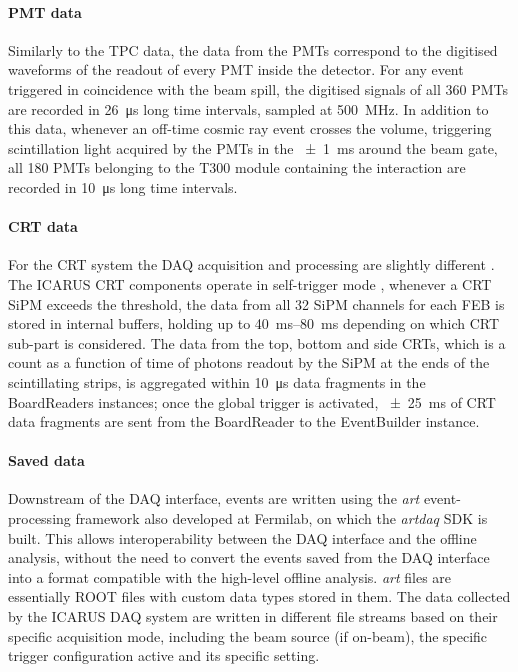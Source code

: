 \paragraph{PMT data} Similarly to the TPC data, the data from the PMTs correspond to the digitised waveforms of the readout of every PMT inside the detector. For any event triggered in coincidence with the beam spill, the digitised signals of all 360 PMTs are recorded in \SI{26}{\us} long time intervals, sampled at \SI{500}{\mega\hertz}. In addition to this data, whenever an off-time cosmic ray event crosses the volume, triggering scintillation light acquired by the PMTs in the \SI{+-1}{\ms} around the beam gate, all 180 PMTs belonging to the T300 module containing the interaction are recorded in \SI{10}{\us} long time intervals. 

\paragraph{CRT data} For the CRT system the DAQ acquisition and processing are slightly different \cite{ICARUS:2025rdw,Poppi:2023zmp,Poppi:2022vhg}. The ICARUS CRT components operate in self-trigger mode \cite{arteroponsStudyReconstructionNuMuCC, ICARUS:2025rdw}, whenever a CRT SiPM exceeds the threshold, the data from all 32 SiPM channels for each FEB is stored in internal buffers, holding up to \qtyrange{40}{80}{\ms} depending on which CRT sub-part is considered. The data from the top, bottom and side CRTs, which is a count as a function of time of photons readout by the SiPM at the ends of the scintillating strips, is aggregated within \SI{10}{\us} data fragments in the BoardReaders instances; once the global trigger is activated, \SI{+-25}{\ms} of CRT data fragments are sent from the BoardReader to the EventBuilder instance. 

\paragraph{Saved data} Downstream of the DAQ interface, events are written using the \emph{art} event-processing framework \cite{greenArtFramework2012} also developed at Fermilab, on which the \emph{artdaq} SDK is built. This allows interoperability between the DAQ interface and the offline analysis, without the need to convert the events saved from the DAQ interface into a format compatible with the high-level offline analysis. \emph{art} files are essentially ROOT files \cite{rene_brun_2019_3895860} with custom data types stored in them. The data collected by the ICARUS DAQ system are written in different file streams based on their specific acquisition mode, including the beam source (if on-beam), the specific trigger configuration active and its specific setting.

